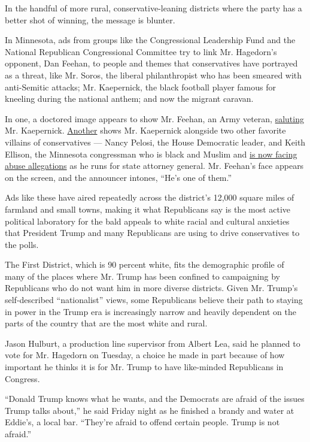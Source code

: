 In the handful of more rural, conservative-leaning districts where the
party has a better shot of winning, the message is blunter.

In Minnesota, ads from groups like the Congressional Leadership Fund and
the National Republican Congressional Committee try to link Mr.
Hagedorn's opponent, Dan Feehan, to people and themes that conservatives
have portrayed as a threat, like Mr. Soros, the liberal philanthropist
who has been smeared with anti-Semitic attacks; Mr. Kaepernick, the
black football player famous for kneeling during the national anthem;
and now the migrant caravan.

In one, a doctored image appears to show Mr. Feehan, an Army veteran,
\href{https://www.youtube.com/watch?v=9-22S-kFong\&feature=youtu.be}{saluting}
Mr. Kaepernick.
\href{https://www.congressionalleadershipfund.org/new-ad-in-mn-01-dan-feehans-liberal-resistance/}{Another}
shows Mr. Kaepernick alongside two other favorite villains of
conservatives --- Nancy Pelosi, the House Democratic leader, and Keith
Ellison, the Minnesota congressman who is black and Muslim and
\href{https://www.nytimes3xbfgragh.onion/2018/09/26/us/politics/ellison-abuse-accusation.html}{is
now facing abuse allegations} as he runs for state attorney general. Mr.
Feehan's face appears on the screen, and the announcer intones, ``He's
one of them.''

Ads like these have aired repeatedly across the district's 12,000 square
miles of farmland and small towns, making it what Republicans say is the
most active political laboratory for the bald appeals to white racial
and cultural anxieties that President Trump and many Republicans are
using to drive conservatives to the polls.

The First District, which is 90 percent white, fits the demographic
profile of many of the places where Mr. Trump has been confined to
campaigning by Republicans who do not want him in more diverse
districts. Given Mr. Trump's self-described ``nationalist'' views, some
Republicans believe their path to staying in power in the Trump era is
increasingly narrow and heavily dependent on the parts of the country
that are the most white and rural.

Jason Hulburt, a production line supervisor from Albert Lea, said he
planned to vote for Mr. Hagedorn on Tuesday, a choice he made in part
because of how important he thinks it is for Mr. Trump to have
like-minded Republicans in Congress.

``Donald Trump knows what he wants, and the Democrats are afraid of the
issues Trump talks about,'' he said Friday night as he finished a brandy
and water at Eddie's, a local bar. ``They're afraid to offend certain
people. Trump is not afraid.''

